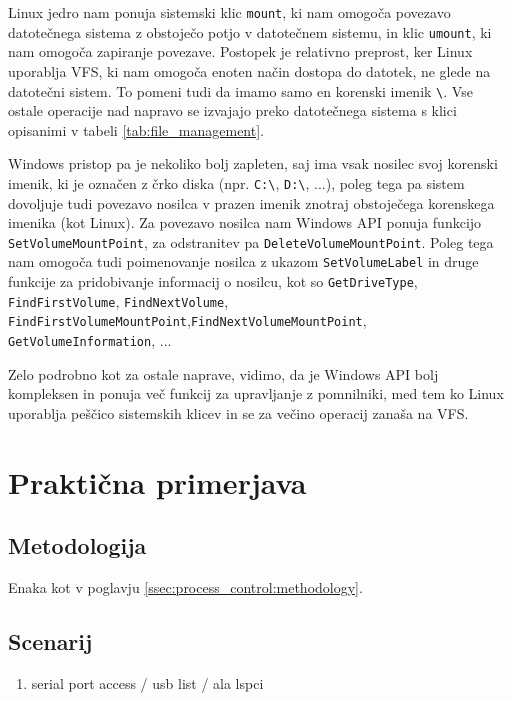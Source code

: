\documentclass[a4paper,12pt,openright]{book}
\begin{document}
Linux jedro nam ponuja sistemski klic \verb|mount|, ki nam omogoča povezavo datotečnega sistema z obstoječo potjo v datotečnem sistemu, in klic \verb|umount|, ki nam omogoča zapiranje povezave.
Postopek je relativno preprost, ker Linux uporablja VFS, ki nam omogoča enoten način dostopa do datotek, ne glede na datotečni sistem. To pomeni tudi da imamo samo en korenski imenik \verb|\|.
Vse ostale operacije nad napravo se izvajajo preko datotečnega sistema s klici opisanimi v tabeli \ref{tab:file_management}.

Windows pristop pa je nekoliko bolj zapleten, saj ima vsak nosilec svoj korenski imenik, ki je označen z črko diska (npr. \verb|C:\|, \verb|D:\|, ...), poleg tega pa sistem dovoljuje tudi povezavo nosilca v prazen imenik znotraj obstoječega korenskega imenika (kot Linux).
Za povezavo nosilca nam Windows API ponuja funkcijo \verb|SetVolumeMountPoint|, za odstranitev pa \verb|DeleteVolumeMountPoint|.
Poleg tega nam omogoča tudi poimenovanje nosilca z ukazom \verb|SetVolumeLabel| in druge funkcije za pridobivanje informacij o nosilcu, kot so \verb|GetDriveType|, \verb|FindFirstVolume|, \verb|FindNextVolume|, \verb|FindFirstVolumeMountPoint|,\newline\verb|FindNextVolumeMountPoint|, \verb|GetVolumeInformation|, ...

Zelo podrobno kot za ostale naprave, vidimo, da je Windows API bolj kompleksen in ponuja več funkcij za upravljanje z pomnilniki, med tem ko Linux uporablja peščico sistemskih klicev in se za večino operacij zanaša na VFS.

\section{Praktična primerjava}

\subsection{Metodologija}

Enaka kot v poglavju \ref{ssec:process_control:methodology}.

\subsection{Scenarij}

\begin{enumerate}
	\item serial port access / usb list / ala lspci
\end{enumerate}
\end{document}
